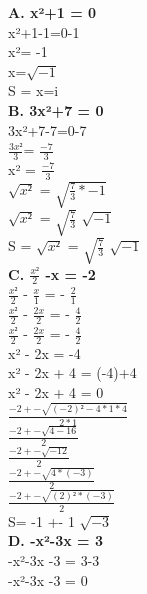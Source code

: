 \textbf{A. x²+1 = 0} \\

x²+1-1=0-1 \\
x²= -1 \\
x=$\sqrt{-1}$ \\
S = x=i \\

\vspace{5mm} %
\textbf{B. 3x²+7 = 0} \\

3x²+7-7=0-7 \\

$\frac{3x²}{3}$= $\frac{-7}{3}$ \\

x² = $\frac{-7}{3}$ \\
$\sqrt{x²}$ = $\sqrt{\frac{7}{3} *-1}$ \\
$\sqrt{x²}$ = $\sqrt{\frac{7}{3}}$ $\sqrt{-1}$ \\
S = $\sqrt{x²}$ = $\sqrt{\frac{7}{3}}$ $\sqrt{-1}$ \\

\vspace{5mm} %
\textbf{C. $\frac{x²}{2}$ -x = -2} \\

$\frac{x²}{2}$ - $\frac{x}{1}$ = - $\frac{2}{1}$\\

$\frac{x²}{2}$ - $\frac{2x}{2}$ = - $\frac{4}{2}$\\

$\frac{x²}{2}$ - $\frac{2x}{2}$ = - $\frac{4}{2}$\\

x² - 2x = -4 \\
x² - 2x + 4 = (-4)+4 \\
x² - 2x + 4 = 0 \\

$\frac{-2+-\sqrt{(-2)²-4*1*4}}{2*1}$ \\
$\frac{-2+-\sqrt{4 - 16}}{2}$ \\
$\frac{-2+-\sqrt{-12}}{2}$ \\
$\frac{-2+-\sqrt{4*(-3)}}{2}$ \\
$\frac{-2+-\sqrt{(2)²*(-3)}}{2}$ \\
S= -1 +- 1 $\sqrt{-3}$ \\


\newpage
\textbf{D. -x²-3x = 3} \\

-x²-3x -3 = 3-3 \\
-x²-3x -3 = 0 \\

